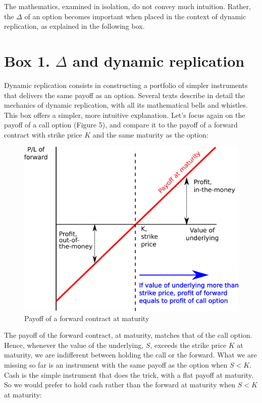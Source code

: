 \documentclass[]{book}
\theoremstyle{definition}
\theoremstyle{definition}
\theoremstyle{definition}
\theoremstyle{remark}
\begin{document}
The mathematics, examined in isolation, do not convey much intuition.
Rather, the \(\Delta\) of an option becomes important when placed in the
context of dynamic replication, as explained in the following box.

\section*{\texorpdfstring{Box 1. \(\Delta\) and dynamic
replication}{Box 1. \textbackslash{}Delta and dynamic replication}}\label{box-1.-delta-and-dynamic-replication}

Dynamic replication consists in constructing a portfolio of simpler
instruments that delivers the same payoff as an option. Several texts
describe in detail the mechanics of dynamic replication, with all its
mathematical bells and whistles. This box offers a simpler, more
intuitive explanation. Let's focus again on the payoff of a call option
(Figure 5), and compare it to the payoff of a forward contract with
strike price \(K\) and the same maturity as the option:

\begin{figure}
\includegraphics[width=0.6\linewidth]{images/figLongPosition} \caption{Payoff of a forward contract at maturity}\label{fig:unnamed-chunk-23}
\end{figure}

The payoff of the forward contract, at maturity, matches that of the
call option. Hence, whenever the value of the underlying, \(S\), exceeds
the strike price \(K\) at maturity, we are indifferent between holding
the call or the forward. What we are missing so far is an instrument
with the same payoff as the option when \(S < K\). Cash is the simple
instrument that does the trick, with a flat payoff at maturity. So we
would prefer to hold cash rather than the forward at maturity when
\(S < K\) at maturity:
\end{document}
